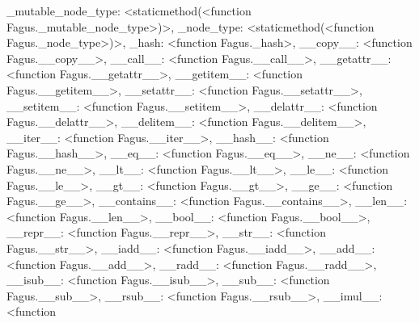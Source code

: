 \documentclass[a4paper,10pt,english]{sphinxmanual}
\begin{document}
\begin{fulllineitems}
\begin{fulllineitems}
\textquotesingle{}\_mutable\_node\_type\textquotesingle{}: \textless{}staticmethod(\textless{}function Fagus.\_mutable\_node\_type\textgreater{})\textgreater{}, \textquotesingle{}\_node\_type\textquotesingle{}: \textless{}staticmethod(\textless{}function Fagus.\_node\_type\textgreater{})\textgreater{}, \textquotesingle{}\_hash\textquotesingle{}: \textless{}function Fagus.\_hash\textgreater{}, \textquotesingle{}\_\_copy\_\_\textquotesingle{}: \textless{}function Fagus.\_\_copy\_\_\textgreater{}, \textquotesingle{}\_\_call\_\_\textquotesingle{}: \textless{}function Fagus.\_\_call\_\_\textgreater{}, \textquotesingle{}\_\_getattr\_\_\textquotesingle{}: \textless{}function Fagus.\_\_getattr\_\_\textgreater{}, \textquotesingle{}\_\_getitem\_\_\textquotesingle{}: \textless{}function Fagus.\_\_getitem\_\_\textgreater{}, \textquotesingle{}\_\_setattr\_\_\textquotesingle{}: \textless{}function Fagus.\_\_setattr\_\_\textgreater{}, \textquotesingle{}\_\_setitem\_\_\textquotesingle{}: \textless{}function Fagus.\_\_setitem\_\_\textgreater{}, \textquotesingle{}\_\_delattr\_\_\textquotesingle{}: \textless{}function Fagus.\_\_delattr\_\_\textgreater{}, \textquotesingle{}\_\_delitem\_\_\textquotesingle{}: \textless{}function Fagus.\_\_delitem\_\_\textgreater{}, \textquotesingle{}\_\_iter\_\_\textquotesingle{}: \textless{}function Fagus.\_\_iter\_\_\textgreater{}, \textquotesingle{}\_\_hash\_\_\textquotesingle{}: \textless{}function Fagus.\_\_hash\_\_\textgreater{}, \textquotesingle{}\_\_eq\_\_\textquotesingle{}: \textless{}function Fagus.\_\_eq\_\_\textgreater{}, \textquotesingle{}\_\_ne\_\_\textquotesingle{}: \textless{}function Fagus.\_\_ne\_\_\textgreater{}, \textquotesingle{}\_\_lt\_\_\textquotesingle{}: \textless{}function Fagus.\_\_lt\_\_\textgreater{}, \textquotesingle{}\_\_le\_\_\textquotesingle{}: \textless{}function Fagus.\_\_le\_\_\textgreater{}, \textquotesingle{}\_\_gt\_\_\textquotesingle{}: \textless{}function Fagus.\_\_gt\_\_\textgreater{}, \textquotesingle{}\_\_ge\_\_\textquotesingle{}: \textless{}function Fagus.\_\_ge\_\_\textgreater{}, \textquotesingle{}\_\_contains\_\_\textquotesingle{}: \textless{}function Fagus.\_\_contains\_\_\textgreater{}, \textquotesingle{}\_\_len\_\_\textquotesingle{}: \textless{}function Fagus.\_\_len\_\_\textgreater{}, \textquotesingle{}\_\_bool\_\_\textquotesingle{}: \textless{}function Fagus.\_\_bool\_\_\textgreater{}, \textquotesingle{}\_\_repr\_\_\textquotesingle{}: \textless{}function Fagus.\_\_repr\_\_\textgreater{}, \textquotesingle{}\_\_str\_\_\textquotesingle{}: \textless{}function Fagus.\_\_str\_\_\textgreater{}, \textquotesingle{}\_\_iadd\_\_\textquotesingle{}: \textless{}function Fagus.\_\_iadd\_\_\textgreater{}, \textquotesingle{}\_\_add\_\_\textquotesingle{}: \textless{}function Fagus.\_\_add\_\_\textgreater{}, \textquotesingle{}\_\_radd\_\_\textquotesingle{}: \textless{}function Fagus.\_\_radd\_\_\textgreater{}, \textquotesingle{}\_\_isub\_\_\textquotesingle{}: \textless{}function Fagus.\_\_isub\_\_\textgreater{}, \textquotesingle{}\_\_sub\_\_\textquotesingle{}: \textless{}function Fagus.\_\_sub\_\_\textgreater{}, \textquotesingle{}\_\_rsub\_\_\textquotesingle{}: \textless{}function Fagus.\_\_rsub\_\_\textgreater{}, \textquotesingle{}\_\_imul\_\_\textquotesingle{}: \textless{}function 
\end{fulllineitems}
\end{fulllineitems}
\end{document}

